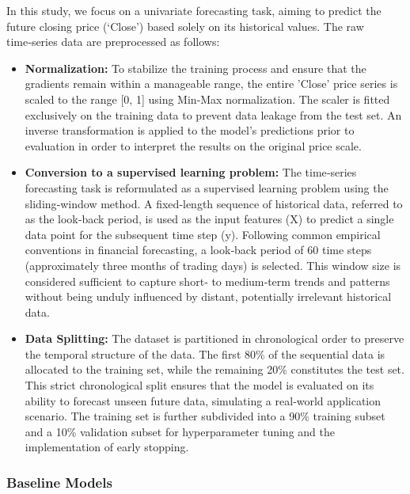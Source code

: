 \documentclass{cys}
\begin{document}
\begin{enumerate}
In this study, we focus on a univariate forecasting task, aiming to predict the future closing price (‘Close’) based solely on its historical values. The raw time‑series data are preprocessed as follows: \\
\begin{itemize}
        \item \textbf{Normalization:}
        To stabilize the training process and ensure that the gradients remain within a manageable range, the entire 'Close' price series is scaled to the range [0, 1] using Min‑Max normalization. The scaler is fitted exclusively on the training data to prevent data leakage from the test set. An inverse transformation is applied to the model's predictions prior to evaluation in order to interpret the results on the original price scale.\\
        \item \textbf{Conversion to a supervised learning problem:}
        The time‑series forecasting task is reformulated as a supervised learning problem using the sliding‑window method. A fixed‑length sequence of historical data, referred to as the look‑back period, is used as the input features (X) to predict a single data point for the subsequent time step (y). Following common empirical conventions in financial forecasting, a look‑back period of 60 time steps (approximately three months of trading days) is selected. This window size is considered sufficient to capture short‑ to medium‑term trends and patterns without being unduly influenced by distant, potentially irrelevant historical data.\\
        \item \textbf{Data Splitting:}
        The dataset is partitioned in chronological order to preserve the temporal structure of the data. The first 80\% of the sequential data is allocated to the training set, while the remaining 20\% constitutes the test set. This strict chronological split ensures that the model is evaluated on its ability to forecast unseen future data, simulating a real‑world application scenario. The training set is further subdivided into a 90\% training subset and a 10\% validation subset for hyperparameter tuning and the implementation of early stopping.
    \end{itemize}

\subsubsection{Baseline Models}
    

\end{enumerate}
\end{document}
